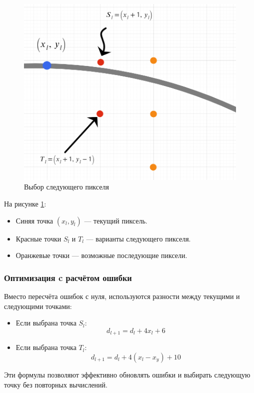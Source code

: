 \begin{figure}[H]
    \centering
    \includegraphics[width=0.6\linewidth]{example.png}
    \caption{Выбор следующего пикселя}
    \label{fig:next_pixel}
\end{figure}

На рисунке \ref{fig:next_pixel}:
\begin{itemize}
    \item Синяя точка \((x_l, y_l)\) — текущий пиксель.
    \item Красные точки \( S_l \) и \( T_l \) — варианты следующего пикселя.
    \item Оранжевые точки — возможные последующие пиксели.
\end{itemize}

\subsubsection*{Оптимизация c расчётом ошибки}
Вместо пересчёта ошибок с нуля, используются разности между текущими и следующими точками:

\begin{itemize}
    \item Если выбрана точка $S_l$:
          \[
              d_{l+1} = d_l + 4x_l + 6
          \]
    \item Если выбрана точка $T_l$:
          \[
              d_{l+1} = d_l + 4(x_l - x_y) + 10
          \]
\end{itemize}
Эти формулы позволяют эффективно обновлять ошибки и выбирать следующую точку без повторных вычислений.

